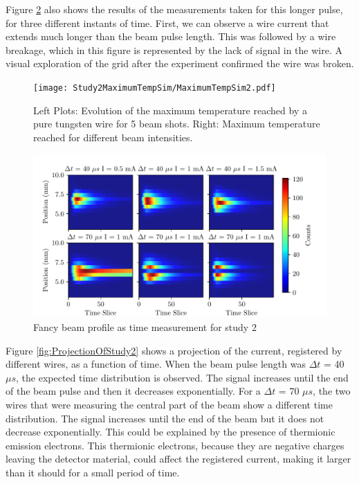 Figure \ref{fig:FancyStudy2Plot} also shows the results of the measurements taken for this longer pulse, for three different instants of time. First, we can observe a wire current that extends much longer than the beam pulse length. This was followed by a wire breakage, which in this figure is represented by the lack of signal in the wire.  A visual exploration of the grid after the experiment confirmed the wire was broken.


\begin{figure}[htb]
    \centering
    \texttt{[image: Study2MaximumTempSim/MaximumTempSim2.pdf]}
    \caption{Left Plots: Evolution of the maximum temperature reached by a pure tungsten wire for 5 beam shots. Right: Maximum temperature reached for different beam intensities. }
    \label{fig:MaxTempStudy2}
\end{figure}


\begin{figure}[htb]
    \centering
    \includegraphics[width=1.0\columnwidth]{FancyPlotStudy2/FancyFigurePlot.pdf}
    \caption{Fancy beam profile as time measurement for study 2}
    \label{fig:FancyStudy2Plot}
\end{figure}


Figure \ref{fig:ProjectionOfStudy2} shows a projection of the current, registered by different wires, as a function of time. When the beam pulse length was  $\Delta t$ = 40 $\mu s$, the expected time distribution is observed. The signal increases until the end of the beam pulse and then it decreases exponentially. For a $\Delta t$ = 70 $\mu s$, the two wires that were measuring the central part of the beam show a different time distribution. The signal increases until the end of the beam but it does not decrease exponentially. This could be explained by the presence of thermionic emission electrons. This thermionic electrons, because they are negative charges leaving the detector material, could affect the registered current, making it larger than it should for a small period of time. 

